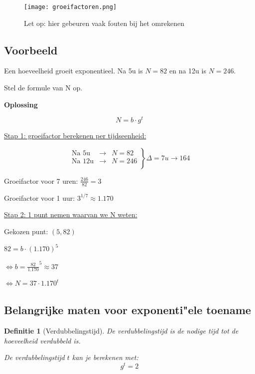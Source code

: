 \documentclass{article}
\newtheorem{theorem}{Definitie}[section]
\begin{document}
\begin{figure}[H]
    \centering
    \texttt{[image: groeifactoren.png]}
    \caption{Let op: hier gebeuren vaak fouten bij het omrekenen}
\end{figure}

\subsection{Voorbeeld}

Een hoeveelheid groeit exponentieel. Na 5u is $N = 82$ en na 12u is $N = 246$.

Stel de formule van N op.

\textbf{Oplossing}

\begin{equation}
N = b \cdot g^t
\end{equation}

\underline{Stap 1: groeifactor berekenen per tijdseenheid:}

\begin{center}
$$
\left.
    \begin{array}{lll}
        \text{Na 5u}  & \rightarrow & N = 82 \\
        \text{Na 12u} & \rightarrow & N = 246 \\
    \end{array}
\right \} \Delta = 7u \rightarrow 164
$$


Groeifactor voor 7 uren: $\frac{246}{82} = 3$

Groeifactor voor 1 uur: $3^{1/7} \approx 1.170$
\end{center}

\underline{Stap 2: 1 punt nemen waarvan we N weten:}

\begin{center}

Gekozen punt: $(5, 82)$

$82 = b \cdot (1.170)^5$

$\Leftrightarrow b = \frac{82}{1.170}^5 \approx 37$

$\Leftrightarrow N = 37 \cdot 1.170^t$
\end{center}

\subsection{Belangrijke maten voor exponenti"ele toename}


\begin{theorem}[Verdubbelingstijd]
De verdubbelingstijd is de nodige tijd tot de hoeveelheid verdubbeld is.

De verdubbelingstijd $t$ kan je berekenen met:
\begin{equation}
g^t = 2
\end{equation}
\end{theorem}
\end{document}

